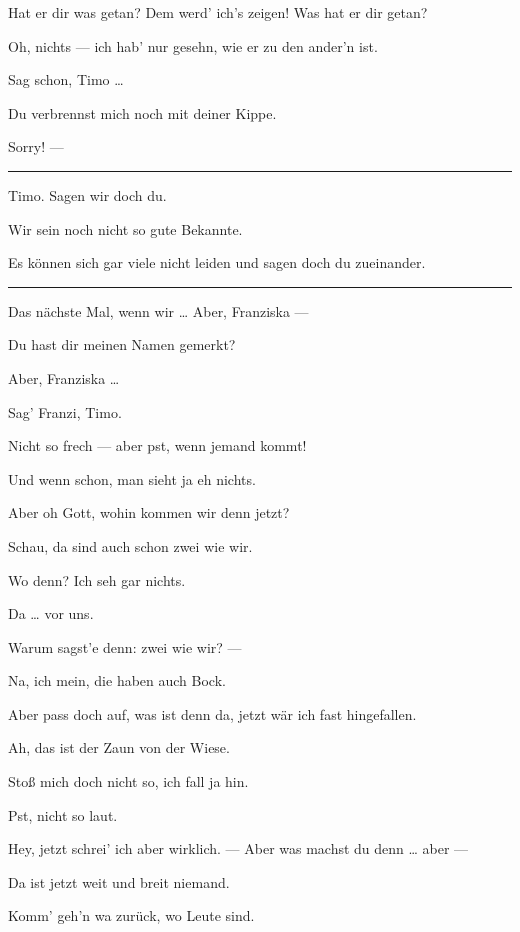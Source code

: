 \documentclass[
	final,
	a4paper,
	ngerman,
	mpinclude = true, %
	twoside = true,
	open = right,
	cleardoublepage = plain,
	DIV = 13,
	BCOR = 1cm,
	titlepage = firstiscover,
	]{scrbook}
\newenvironment{deletion}{%
		\vspace{0.25\baselineskip}
		\hrule
		\vspace{0.25\baselineskip}
		\color{darkgray}
	}{
		\color{black}
		\vspace{0.25\baselineskip}
		\hrule 
		\vspace{0.25\baselineskip}
	}
\newcommand{\thecharacter}[1]{\textup{\textsc{#1}}\xspace}
\newcommand{\thesoldatin}{\thecharacter{Franziska}}
\newcommand{\thepraktikant}{\thecharacter{Timo}}
\newcommand{\character}[1]{\item[#1:]}
\newcommand{\soldatin}{\character{\thesoldatin}}
\newcommand{\praktikant}{\character{\thepraktikant}}
\begin{document}
\begin{play}
	\soldatin
	Hat er dir was getan? Dem werd' ich's zeigen! Was hat er dir getan?

	\praktikant
	Oh, nichts --- ich hab' nur gesehn, wie er zu den ander'n ist.

	\soldatin
	Sag schon, Timo \ldots{}

	\praktikant
	Du verbrennst mich noch mit deiner Kippe.

	\soldatin
	Sorry! ---
	\begin{deletion}
	Timo. Sagen wir doch du.

	\praktikant
	Wir sein noch nicht so gute Bekannte.

	\soldatin
	Es können sich gar viele nicht leiden und sagen doch du zueinander.
	\end{deletion}

	\praktikant
	Das nächste Mal, wenn wir \ldots{} Aber, Franziska ---

	\soldatin
	Du hast dir meinen Namen gemerkt?

	\praktikant
	Aber, Franziska \ldots{}

	\soldatin
	Sag' Franzi, Timo.

	\praktikant
	Nicht so frech --- aber pst, wenn jemand kommt!

	\soldatin
	Und wenn schon, man sieht ja eh nichts.

	\praktikant
	Aber oh Gott, wohin kommen wir denn jetzt?

	\soldatin
	Schau, da sind auch schon zwei wie wir.

	\praktikant
	Wo denn? Ich seh gar nichts.

	\soldatin
	Da \ldots{} vor uns.

	\praktikant
	Warum sagst'e denn: zwei wie wir? ---

	\soldatin
	Na, ich mein, die haben auch Bock.

	\praktikant
	Aber pass doch auf, was ist denn da, jetzt wär ich fast hingefallen.

	\soldatin
	Ah, das ist der Zaun von der Wiese.

	\praktikant
	Stoß mich doch nicht so, ich fall ja hin.

	\soldatin
	Pst, nicht so laut.

	\praktikant
	Hey, jetzt schrei' ich aber wirklich. --- Aber was machst du denn \ldots{} aber ---

	\soldatin
	Da ist jetzt weit und breit niemand.

	\praktikant
	Komm' geh'n wa zurück, wo Leute sind.


\end{play}
\end{document}
